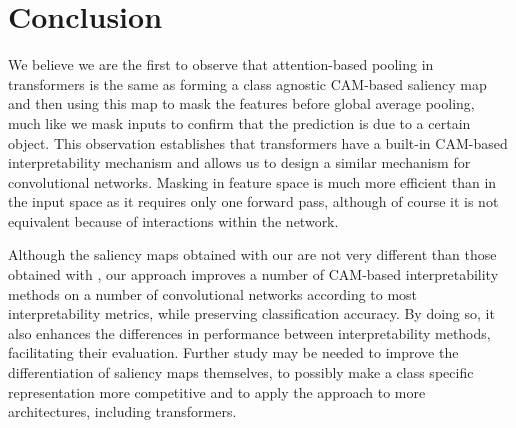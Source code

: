 \section{Conclusion}

We believe we are the first to observe that attention-based pooling in transformers is the same as forming a class agnostic CAM-based saliency map and then using this map to mask the features before global average pooling, much like we mask inputs to confirm that the prediction is due to a certain object. This observation establishes that transformers have a built-in CAM-based interpretability mechanism and allows us to design a similar mechanism for convolutional networks. Masking in feature space is much more efficient than in the input space as it requires only one forward pass, although of course it is not equivalent because of interactions within the network.

Although the saliency maps obtained with our \Ours are not very different than those obtained with \gap, our approach improves a number of CAM-based interpretability methods on a number of convolutional networks according to most interpretability metrics, while preserving classification accuracy. By doing so, it also enhances the differences in performance between interpretability methods, facilitating their evaluation. Further study may be needed to improve the differentiation of saliency maps themselves, to possibly make a class specific representation more competitive and to apply the approach to more architectures, including transformers.